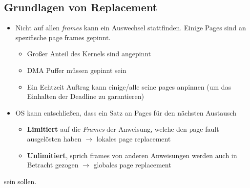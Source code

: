 \documentclass[a4paper]{scrreprt}
\begin{document}
\subsection{Grundlagen von Replacement}
\begin{itemize}
\item Nicht auf allen \textit{frames} kann ein Auswechsel stattfinden. Einige Pages sind an spezifische page frames gepinnt.
\begin{itemize}
\item Großer Anteil des Kernels sind angepinnt
\item DMA Puffer müssen gepinnt sein
\item Ein Echtzeit Auftrag kann einige/alle seine pages anpinnen (um das Einhalten der Deadline zu garantieren)
\end{itemize}
\item OS kann entschließen, dass ein Satz an Pages für den nächsten Austausch  
\begin{itemize}
\item \textbf{Limitiert} auf die \textit{Frames} der Anweisung, welche den page fault ausgelösten haben $\rightarrow$ lokales page replacement
\item \textbf{Unlimitiert}, sprich frames von anderen Anweisungen werden auch in Betracht gezogen $\rightarrow$ globales page replacement
\end{itemize}
\end{itemize}
sein sollen.
\end{document}
